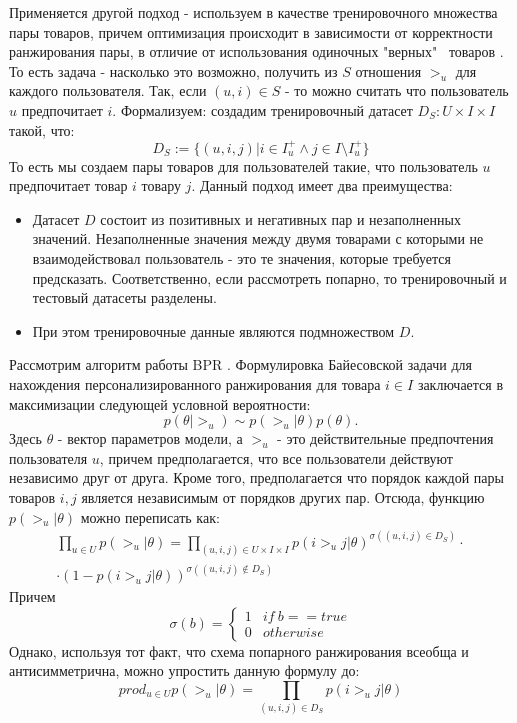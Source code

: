 \documentclass[14pt]{mmcs_article}
\begin{document}
 Применяется другой подход - используем в качестве тренировочного множества пары товаров, причем оптимизация происходит в зависимости от корректности ранжирования пары, в отличие от использования одиночных "верных" \  товаров \cite{BPR:1205}. То есть задача - насколько это возможно, получить из $S$ отношения $>_u$ для каждого пользователя. Так, если $ (u,i) \in S $ - то можно считать что пользователь $ u $ предпочитает $ i $. Формализуем: создадим тренировочный датасет $ D_S: U \times I \times I $ такой, что:
\begin{equation}
	D_S := \{ (u,i,j) | i \in I_u^+ \wedge j \in I \setminus I_u^+ \}
\end{equation}
То есть мы создаем пары товаров для пользователей такие, что пользователь $ u $ предпочитает товар $ i $ товару $ j $.
Данный подход имеет два преимущества:
\begin{itemize}
	\item Датасет $D$ состоит из позитивных и негативных пар и незаполненных значений. Незаполненные значения между двумя товарами с которыми не взаимодействовал пользователь - это те значения, которые требуется предсказать. Соответственно, если рассмотреть попарно, то тренировочный и тестовый датасеты разделены.
	\item При этом тренировочные данные являются подмножеством $D$. 
\end{itemize}     

Рассмотрим алгоритм работы BPR \cite{BPR:1205}.
Формулировка Байесовской задачи для нахождения персонализированного ранжирования для товара $  i \in I$ заключается в максимизации следующей условной вероятности:
\begin{equation}
	p(\theta | >_u) \sim p(>_u | \theta)p(\theta).
\end{equation} 
Здесь $\theta$ - вектор параметров модели, а $ >_u $ - это действительные предпочтения пользователя $ u $, причем предполагается, что все пользователи действуют независимо друг от друга. Кроме того, предполагается что порядок каждой пары товаров $ i,j $ является независимым от порядков других пар. Отсюда, функцию $ p(>_u | \theta) $ можно 
переписать как:
\begin{multline}
	\prod_{u \in U} p(>_u | \theta) = 	\prod_{(u,i,j) \in U \times I \times I} p(i >_u j | \theta )^{\sigma((u,i,j) \in D_S)} \cdot \\ \cdot (1 - p(i >_u j | \theta ))^{\sigma((u,i,j) \notin D_S)}
\end{multline}
Причем
\begin{equation}
	\sigma(b) = \begin{cases}
		1 & if \ b == true \\
		0 & otherwise
	\end{cases}
\end{equation}
Однако, используя тот факт, что схема попарного ранжирования всеобща и антисимметрична, можно упростить данную формулу до:
\begin{equation}
	prod_{u \in U} p(>_u | \theta) = \prod_{(u,i,j) \in D_S} p(i >_u j | \theta)
\end{equation}
\end{document}
